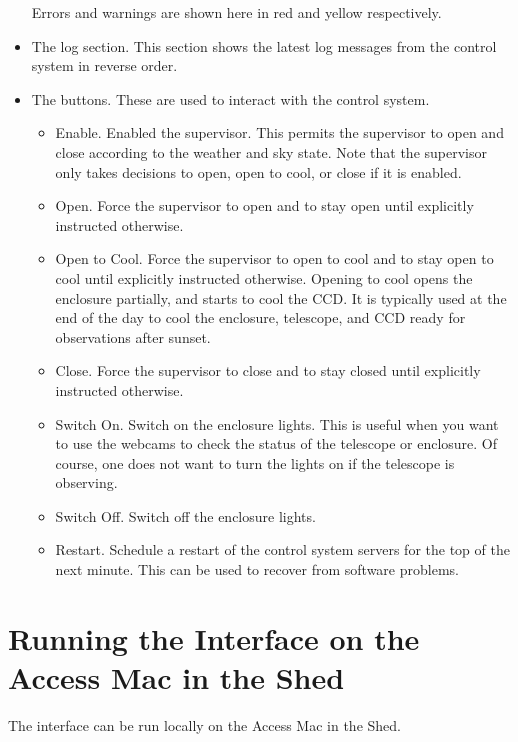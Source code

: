 \begin{itemize}
Errors and warnings are shown here in red and yellow respectively.
\item
The log section. This section shows the latest log messages from the control system in reverse order.
\item
The buttons. These are used to interact with the control system.
\begin{itemize}
\item
Enable. Enabled the supervisor. This permits the supervisor to open and close according to the weather and sky state. Note that the supervisor only takes decisions to open, open to cool, or close if it is enabled. 
\item
Open. Force the supervisor to open and to stay open until explicitly instructed otherwise.
\item
Open to Cool. Force the supervisor to open to cool and to stay open to cool until explicitly instructed otherwise. Opening to cool opens the enclosure partially,  and starts to cool the CCD. It is typically used at the end of the day to cool the enclosure, telescope, and CCD ready for observations after sunset.
\item
Close. Force the supervisor to close and to stay closed until explicitly instructed otherwise.
\label{interface-close-button}
\item
Switch On. Switch on the enclosure lights. This is useful when you want to use the webcams to check the status of the telescope or enclosure. Of course, one does not want to turn the lights on if the telescope is observing.
\label{interface-switch-on-button}
\item
Switch Off. Switch off the enclosure lights. 
\label{interface-switch-off-button}

\item
Restart. Schedule a restart of the control system servers for the top of the next minute. This can be used to recover from software problems.
\label{interface-restart-button}

\end{itemize}
\end{itemize}

\section{Running the Interface on the Access Mac in the Shed}
\label{section:interface-access-mac}

The interface can be run locally on the Access Mac in the Shed.

